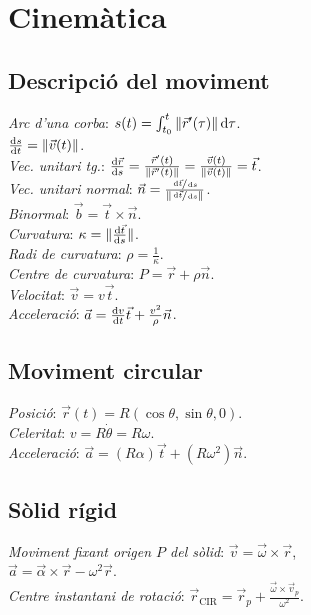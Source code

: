 \section{Cinem\`atica}

\subsection{Descripci\'o del moviment}
\emph{Arc d'una corba}: $s(t) = \int^t_{t_0} \|\vec{r}'(\tau)\| \dif\tau$. \\
\ci $\frac{\dif s}{\dif t} = \|\vec{v}(t)\|$. \\
\emph{Vec. unitari tg.}: $\frac{\dif \vec{r}}{\dif s} = \frac{\vec{r}'(t)}{\|\vec{r}'(t)\|} = \frac{\vec{v}(t)}{\|\vec{v}(t)\|} = \vec{t}$. \\
\emph{Vec. unitari normal}: $\vec{n} = \frac{\sfrac{\dif \vec{t}}{\dif s}}{\|\sfrac{\dif \vec{t}}{\dif s}\|}$. \\
\emph{Binormal}: $\vec{b} = \vec{t} \times \vec{n}$. \\
\emph{Curvatura}: $\kappa = \|\frac{\dif \vec{t}}{\dif s}\|$. \\
\emph{Radi de curvatura}: $\rho = \frac{1}{\kappa}$. \\
\emph{Centre de curvatura}: $P = \vec{r} + \rho\vec{n}$.\\
\emph{Velocitat}: $\vec{v} = v\vec{t}$. \\
\emph{Acceleraci\'o}: $\vec{a} = \frac{\dif v}{\dif t}\vec{t} + \frac{v^2}{\rho}\vec{n}$.

\subsection{Moviment circular}
\emph{Posici\'o}: $\vec{r}(t) = R(\cos \theta, \sin \theta, 0)$. \\
\emph{Celeritat}: $v = R\dot\theta = R\omega$. \\
\emph{Acceleraci\'o}: $\vec{a} = (R\alpha)\vec{t} + (R\omega^2)\vec{n}$.

\subsection{S\`olid r\'igid}
\emph{Moviment fixant origen $P$ del sòlid}: $\vec{v} = \vec{\omega} \times \vec{r}$,\\
$\vec{a} =  \vec{\alpha} \times \vec{r} - \omega^2 \vec{r}$.\\
\emph{Centre instantani de rotaci\'o}: $\vec{r}_{\text{CIR}} = \vec{r}_p + \frac{\vec{\omega} \times \vec{v}_p}{\omega^2}$.


